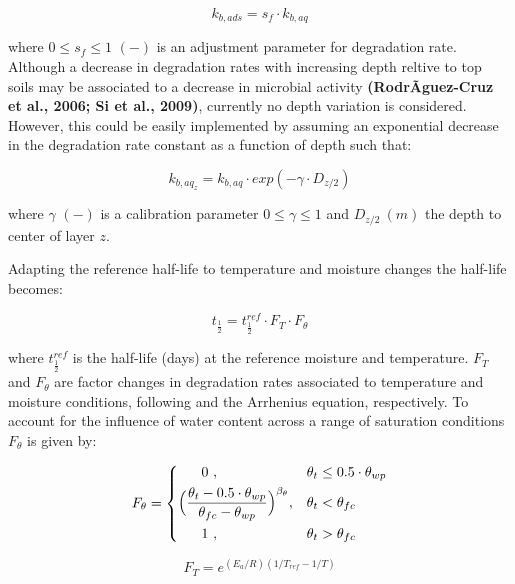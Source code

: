 \documentclass[]{article}
\begin{document}
\begin{equation}
k_{b,ads} = s_f \cdot k_{b,aq}   
\label{eq:k_bads}
\end{equation}

where \(0 \leq s_f \leq 1\) \((-)\) is an adjustment parameter for
degradation rate. Although a decrease in degradation rates with
increasing depth reltive to top soils may be associated to a decrease in
microbial activity \textbf{(RodrÃ­guez-Cruz et al., 2006; Si et al.,
2009)}, currently no depth variation is considered. However, this could
be easily implemented by assuming an exponential decrease in the
degradation rate constant as a function of depth such that:

\begin{equation}
k_{{b,aq}_z} = k_{b,aq}\cdot exp(-\gamma \cdot D_{z/2}) 
\label{eq:gamma}
\end{equation}

where \(\gamma\) \((-)\) is a calibration parameter
\(0 \leq \gamma \leq 1\) and \(D_{z/2}~(m)\) the depth to center of
layer \(z\).

Adapting the reference half-life to temperature and moisture changes the
half-life becomes:

\begin{equation}
t_\frac{1}{2}=t_\frac{1}{2}^{ref}\cdot F_T \cdot F_\theta
\label{eq:DT50} 
\end{equation}

where \(t_\frac{1}{2}^{ref}\) is the half-life (days) at the reference
moisture and temperature. \(F_T\) and \(F_\theta\) are factor changes in
degradation rates associated to temperature and moisture conditions,
following \cite{Schroll2006} and the Arrhenius equation, respectively.
To account for the influence of water content across a range of
saturation conditions \(F_\theta\) is given by:

\begin{equation} 
    F_\theta = 
\begin{dcases}
     ~~~~~0~,                 & \theta_t \leq 0.5 \cdot \theta_{wp} \\
    \Big(\frac{ \theta_t- 0.5 \cdot \theta_{wp} } { \theta_{fc} - \theta_{wp} }\Big)^{\beta_{\theta} },    & \theta_t <  \theta_{fc} \\
     ~~~~~1~,                 & \theta_t > \theta_{fc} 
\end{dcases}
\end{equation}

\begin{equation} 
F_T = e^{(E_a/R)(1/T_{ref} - 1/T)}
\end{equation}
\end{document}

